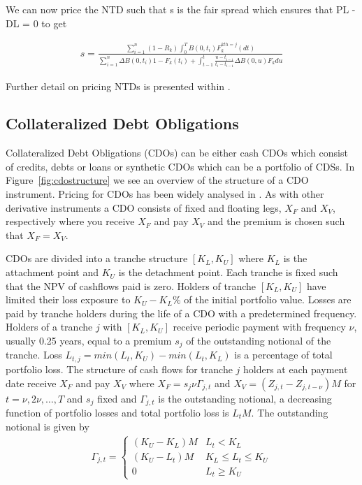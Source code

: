 We can now price the NTD such that s is the fair spread which ensures that PL - DL = 0 to get

\begin{align}\label{ntd_ap}
 s = \frac{ \sum_{i=1}^n (1-R_k) \int_0^T B(0,t_i) F^{kth = j}_k (dt)   }{\sum_{i=1}^n \Delta B(0,t_i) 1 - F_{k} (t_i) + \int^t_{t-1} \frac{u - t_{i-1}}{t_i - t_{i-1}} \Delta B(0,u) F_k du}
\end{align} 

Further detail on pricing NTDs is presented within \cite{Sch2003,Gal03}.

\subsection{Collateralized Debt Obligations}

Collateralized Debt Obligations (CDOs) can be either cash CDOs which consist of credits, debts or loans or synthetic CDOs which can be a portfolio of CDSs. In Figure~\ref{fig:cdostructure} we see an overview of the structure of a CDO instrument. Pricing for CDOs has been widely analysed in \cite{Neu2007,LBG2008}. As with other derivative instruments a CDO consists of fixed and floating legs, $X_F$ and $X_V$, respectively where you receive $X_F$ and pay $X_V$ and the premium is chosen such that $X_F = X_V$.

CDOs are divided into a tranche structure $[K_L,K_U]$ where $K_L$ is the attachment point and $K_U$ is the detachment point. Each tranche is fixed such that the NPV of cashflows paid is zero. Holders of tranche $[K_L,K_U]$ have limited their loss exposure to $K_U - K_L \% $ of the initial portfolio value. Losses are paid by tranche holders during the life of a CDO with a predetermined frequency.  Holders of a tranche $j$ with $[K_L,K_U]$  receive periodic payment with frequency $\nu$, usually 0.25 years, equal to a premium $s_j$ of the outstanding notional of the tranche. Loss $L_{t,j} = min (L_t,K_U) - min (L_t,K_L)$ is a percentage of total portfolio loss.  The structure of cash flows for tranche $j$ holders at each payment date receive $X_F$ and pay $X_V$ where
$ X_F = s_j \nu \Gamma_{j,t} $ and 
$	X_V = (Z_{j,t}-Z_{j,t-\nu})M  $ for $t = \nu, 2\nu, \ldots, T$ and $s_j$ fixed and $\Gamma_{j,t}$ is the outstanding notional, a decreasing function of portfolio losses and total portfolio loss is $L_t M$.   The outstanding notional is given by
\begin{align}
\Gamma_{j,t} = \begin{cases} 
						(K_U-K_L)M & L_t < K_L \nonumber \\
						(K_U-L_t)M & K_L \leq L_t \leq K_U  \\
						0			& L_t \geq K_U 
				\end{cases}
\end{align}


